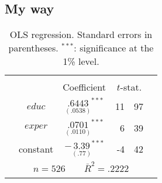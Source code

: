 \documentclass{article}			%
\theoremstyle{definition}
\theoremstyle{remark}
\begin{document}
\subsection*{My way}

\begin{table}[H]
\centering
\begin{tabular}{cccr@{.}lc}
\Xhline{3\arrayrulewidth}
\multicolumn{6}{c}{Dependent variable: $wage$} \\
& & {\small Coefficient} & \multicolumn{2}{c}{\small $t$-stat.} & \\
\cline{2-5}
& $educ$ & $\underset{(.0538)}{.6443}^{***}$ & 11&97 & \\
& $exper$ & $\underset{(.0110)}{.0701}^{***}$ & 6&39 & \\
& constant & $- \underset{(.77)}{3.39}^{***}$ & -4&42 & \\
\cline{2-5}
\multicolumn{6}{c}{$n=526 \qquad \bar{R}^2 = .2222$} \\
\Xhline{3\arrayrulewidth}
\end{tabular}
\caption{OLS regression. 
{\scriptsize Standard errors in parentheses.
$^{***}$: significance at the 1\% level.}}
\end{table}
\end{document}
